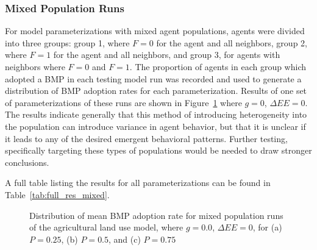 \subsubsection{Mixed Population Runs}

For model parameterizations with mixed agent populations,
agents were divided into three groups:
group 1, where $F=0$ for the agent and all neighbors,
group 2, where $F=1$ for the agent and all neighbors, and
group 3, for agents with neighbors where $F=0$ and $F=1$. 
The proportion of agents in each group which adopted a BMP in each testing
model run was recorded and used to generate a distribution of BMP adoption
rates for each parameterization.
Results of one set of parameterizations of these runs are shown
in Figure~\ref{fig:farm_res_mix0} where $g=0$, $\Delta EE=0$.
The results indicate generally that this method of introducing
heterogeneity into the population can introduce variance in
agent behavior, but that it is unclear if it leads to any
of the desired emergent behavioral patterns.
Further testing, specifically targeting these types of populations
would be needed to draw stronger conclusions.

A full table listing the results for all parameterizations can
be found in Table~\ref{tab:full_res_mixed}.

\begin{figure}
    \hfill
    \hfill
    \caption{Distribution of mean BMP adoption rate for mixed population
        runs of the agricultural land use model, where $g=0.0$,
        $\Delta EE=0$,
        for (a) $P=0.25$, (b) $P=0.5$, and (c) $P=0.75$}
    \label{fig:farm_res_mix0}
\end{figure}

